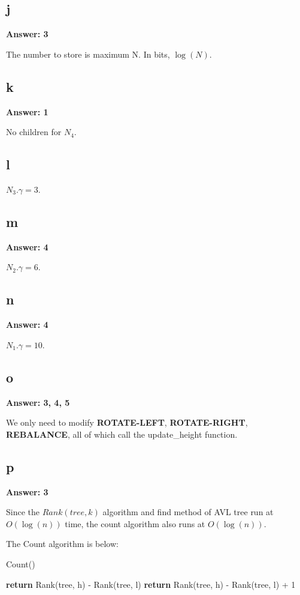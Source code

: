 \documentclass[12pt]{article}%
\newcommand{\runningTime}[1]{$O(#1)$}
\begin{document}
\subsection{j}
\textbf{Answer: 3} \par
The number to store is maximum  N. In bits, $\log(N)$.

\subsection{k}
\textbf{Answer: 1} \par
No children for $N_4$.

\subsection{l}
$N_3.\gamma = 3$.

\subsection{m}
\textbf{Answer: 4} \par
$N_2.\gamma = 6$.

\subsection{n}
\textbf{Answer: 4} \par
$N_1.\gamma = 10$.

\subsection{o}
\textbf{Answer: 3, 4, 5} \par
We only need to modify \textbf{ROTATE-LEFT}, \textbf{ROTATE-RIGHT}, \textbf{REBALANCE}, all of which call the update\_height function.

\subsection{p}
\textbf{Answer: 3} \par
Since the $ Rank(tree, k)$ algorithm  and find method of AVL tree run at \runningTime{\log(n)} time, the count algorithm also runs at \runningTime{\log(n)}. \par
The Count algorithm is below:

  \begin{algorithm}
   \caption{Count()}
    \begin{algorithmic}[1]
      			\State \textbf{return} Rank(tree, h) - Rank(tree, l)
      		\Else
      			\State \textbf{return} Rank(tree, h) - Rank(tree, l) + 1
      		\EndIf
	    \EndFunction
    \end{algorithmic}
\end{algorithm}
\end{document}
